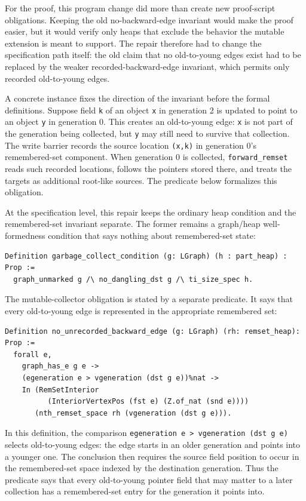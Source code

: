 \documentclass[acmsmall,nonacm]{acmart}
\begin{document}
For the proof, this program change did more than create new proof-script
obligations.  Keeping the old no-backward-edge invariant would make the proof
easier, but it would verify only heaps that exclude the behavior the mutable
extension is meant to support.  The repair therefore had to change the
specification path itself: the old claim that no old-to-young edges exist had to
be replaced by the weaker recorded-backward-edge invariant, which permits only
recorded old-to-young edges.

A concrete instance fixes the direction of the invariant before the formal
definitions.  Suppose field \texttt{k} of an object \texttt{x} in generation 2
is updated to point to an object \texttt{y} in generation 0.  This creates an
old-to-young edge: \texttt{x} is not part of the generation being collected, but
\texttt{y} may still need to survive that collection.  The write barrier records
the source location \texttt{(x,k)} in generation 0's remembered-set component.
When generation 0 is collected, \texttt{forward\_remset} reads such recorded
locations, follows the pointers stored there, and treats the targets as
additional root-like sources.  The predicate below formalizes this obligation.

At the specification level, this repair keeps the ordinary heap condition and
the remembered-set invariant separate.  The former remains a graph/heap
well-formedness condition that says nothing about remembered-set state:

\begin{lstlisting}
Definition garbage_collect_condition (g: LGraph) (h : part_heap) : Prop :=
  graph_unmarked g /\ no_dangling_dst g /\ ti_size_spec h.
\end{lstlisting}

The mutable-collector obligation is stated by a separate predicate.  It says
that every old-to-young edge is represented in the appropriate remembered set:

\begin{lstlisting}
Definition no_unrecorded_backward_edge (g: LGraph) (rh: remset_heap): Prop :=
  forall e,
    graph_has_e g e ->
    (egeneration e > vgeneration (dst g e))%nat ->
    In (RemSetInterior
          (InteriorVertexPos (fst e) (Z.of_nat (snd e))))
       (nth_remset_space rh (vgeneration (dst g e))).
\end{lstlisting}

In this definition, the comparison
\texttt{egeneration e > vgeneration (dst g e)} selects old-to-young edges: the
edge starts in an older generation and points into a younger one.  The
conclusion then requires the source field position to occur in the
remembered-set space indexed by the destination generation.  Thus the predicate
says that every old-to-young pointer field that may matter to a later collection
has a remembered-set entry for the generation it points into.
\end{document}
